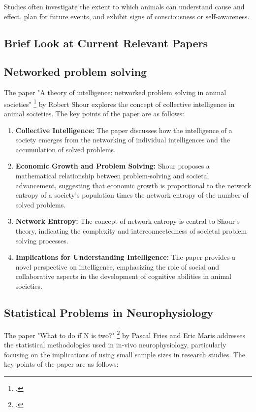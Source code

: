 \documentclass{article}
\begin{document}
Studies often investigate the extent to which animals can understand cause and effect, plan for future events, and exhibit signs of consciousness or self-awareness.

\subsection{Brief Look at Current Relevant Papers}

\subsection*{Networked problem solving}
The paper "A theory of intelligence: networked problem solving in animal societies" \footcite{shour_2009} by Robert Shour explores the concept of collective intelligence in animal societies. The key points of the paper are as follows:

\begin{enumerate}
    \item \textbf{Collective Intelligence:} The paper discusses how the intelligence of a society emerges from the networking of individual intelligences and the accumulation of solved problems.
    
    \item \textbf{Economic Growth and Problem Solving:} Shour proposes a mathematical relationship between problem-solving and societal advancement, suggesting that economic growth is proportional to the network entropy of a society's population times the network entropy of the number of solved problems.
    
    \item \textbf{Network Entropy:} The concept of network entropy is central to Shour's theory, indicating the complexity and interconnectedness of societal problem solving processes.
    
    \item \textbf{Implications for Understanding Intelligence:} The paper provides a novel perspective on intelligence, emphasizing the role of social and collaborative aspects in the development of cognitive abilities in animal societies.
\end{enumerate}

\subsection*{Statistical Problems in Neurophysiology}

The paper "What to do if N is two?" \footcite{fries_maris_2021} by Pascal Fries and Eric Maris addresses the statistical methodologies used in in-vivo neurophysiology, particularly focusing on the implications of using small sample sizes in research studies. The key points of the paper are as follows:
\end{document}
